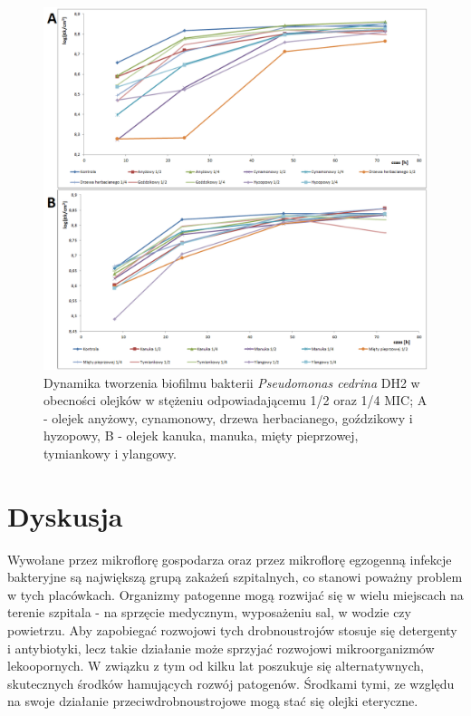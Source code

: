 \documentclass[11pt,a4paper]{report}
\begin{document}
\begin{figure}[!h]
\begin{center}
\includegraphics[scale=0.55]{img/dh2-c.png}
\caption{Dynamika tworzenia biofilmu bakterii \textit{Pseudomonas cedrina} DH2 w obecności olejków w stężeniu odpowiadającemu 1/2 oraz 1/4 MIC; A - olejek anyżowy, cynamonowy, drzewa herbacianego, goździkowy i hyzopowy, B - olejek kanuka, manuka, mięty pieprzowej, tymiankowy i ylangowy.}\label{dh2-c}
\end{center} 
\end{figure}

\clearpage

\chapter{Dyskusja}

Wywołane przez mikroflorę gospodarza oraz przez mikroflorę egzogenną infekcje bakteryjne są największą grupą zakażeń szpitalnych, co stanowi poważny problem w tych placówkach. Organizmy patogenne mogą rozwijać się w wielu miejscach na terenie szpitala - na sprzęcie medycznym, wyposażeniu sal, w wodzie czy powietrzu. Aby zapobiegać rozwojowi tych drobnoustrojów stosuje się detergenty i antybiotyki, lecz takie działanie może sprzyjać rozwojowi mikroorganizmów lekoopornych. 
W związku z tym od kilku lat poszukuje się alternatywnych, skutecznych środków hamujących rozwój patogenów. Środkami tymi, ze względu na swoje działanie przeciwdrobnoustrojowe mogą stać się olejki eteryczne\cite{zakszpit16, czaczyk}.
\end{document}
